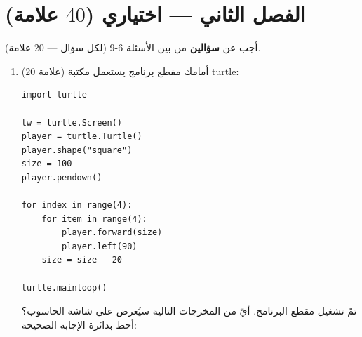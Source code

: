 \documentclass[14pt]{extarticle}
\begin{document}
\clearpage
\section*{الفصل الثاني — اختياري ($40$ علامة)}
أجب عن \textbf{سؤالين} من بين الأسئلة $6$-$9$ (لكل سؤال — $20$ علامة).

\begin{enumerate}[resume, label=\textbf{السؤال \arabic*:}, wide=0pt, itemsep=2.2em]

\item ($20$ علامة) أمامك مقطع برنامج يستعمل مكتبة \textenglish{turtle}:

\begin{boxCode}
\begin{english}
\begin{verbatim}
import turtle

tw = turtle.Screen()
player = turtle.Turtle()
player.shape("square")
size = 100
player.pendown()

for index in range(4):
    for item in range(4):
        player.forward(size)
        player.left(90)
    size = size - 20

turtle.mainloop()
\end{verbatim}
\end{english}
\end{boxCode}

تمّ تشغيل مقطع البرنامج. أيّ من المخرجات التالية سيُعرض على شاشة الحاسوب؟ أحط بدائرة الإجابة الصحيحة:


\end{enumerate}
\end{document}
